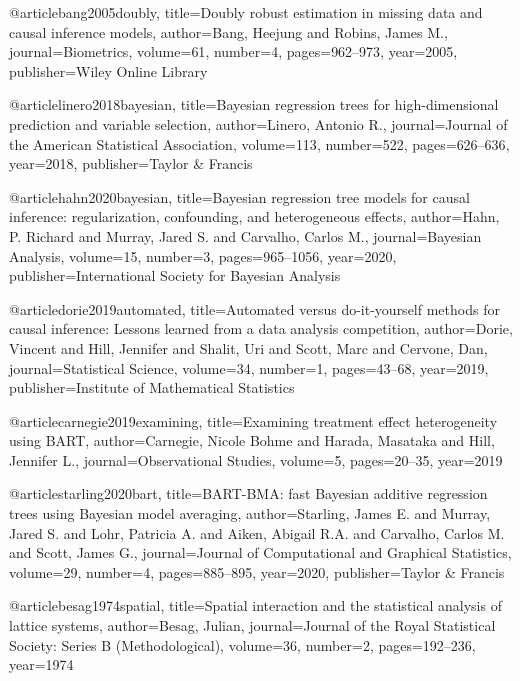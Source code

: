@article{bang2005doubly,
  title={Doubly robust estimation in missing data and causal inference models},
  author={Bang, Heejung and Robins, James M.},
  journal={Biometrics},
  volume={61},
  number={4},
  pages={962--973},
  year={2005},
  publisher={Wiley Online Library}
}


@article{linero2018bayesian,
  title={Bayesian regression trees for high-dimensional prediction and variable selection},
  author={Linero, Antonio R.},
  journal={Journal of the American Statistical Association},
  volume={113},
  number={522},
  pages={626--636},
  year={2018},
  publisher={Taylor \& Francis}
}

@article{hahn2020bayesian,
  title={Bayesian regression tree models for causal inference: regularization, confounding, and heterogeneous effects},
  author={Hahn, P. Richard and Murray, Jared S. and Carvalho, Carlos M.},
  journal={Bayesian Analysis},
  volume={15},
  number={3},
  pages={965--1056},
  year={2020},
  publisher={International Society for Bayesian Analysis}
}

@article{dorie2019automated,
  title={Automated versus do-it-yourself methods for causal inference: Lessons learned from a data analysis competition},
  author={Dorie, Vincent and Hill, Jennifer and Shalit, Uri and Scott, Marc and Cervone, Dan},
  journal={Statistical Science},
  volume={34},
  number={1},
  pages={43--68},
  year={2019},
  publisher={Institute of Mathematical Statistics}
}

@article{carnegie2019examining,
  title={Examining treatment effect heterogeneity using BART},
  author={Carnegie, Nicole Bohme and Harada, Masataka and Hill, Jennifer L.},
  journal={Observational Studies},
  volume={5},
  pages={20--35},
  year={2019}
}

@article{starling2020bart,
  title={{BART}-BMA: fast {B}ayesian additive regression trees using {B}ayesian model averaging},
  author={Starling, James E. and Murray, Jared S. and Lohr, Patricia A. and Aiken, Abigail R.A. and Carvalho, Carlos M. and Scott, James G.},
  journal={Journal of Computational and Graphical Statistics},
  volume={29},
  number={4},
  pages={885--895},
  year={2020},
  publisher={Taylor \& Francis}
}



@article{besag1974spatial,
  title={Spatial interaction and the statistical analysis of lattice systems},
  author={Besag, Julian},
  journal={Journal of the Royal Statistical Society: Series B (Methodological)},
  volume={36},
  number={2},
  pages={192--236},
  year={1974}
}

